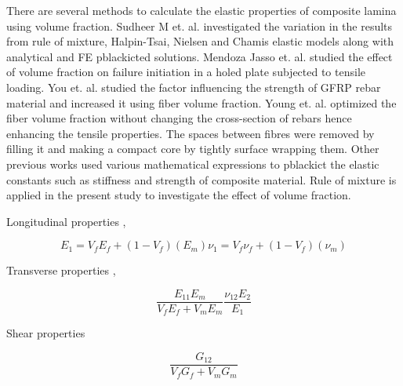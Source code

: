 \documentclass[a4paper,11pt, hidelinks]{article}
\begin{document}
There are several methods to calculate the elastic properties of composite lamina using volume fraction. Sudheer M et. al. \cite{Sudheer2015} investigated the variation in the results from rule of mixture, Halpin-Tsai, Nielsen and Chamis elastic models along with analytical and FE pblackicted solutions. Mendoza Jasso et. al.\cite{MendozaJasso2011} studied the effect of volume fraction on failure initiation in a holed plate subjected to tensile loading. You et. al. \cite{You2015} studied the factor influencing the strength of GFRP rebar material and increased it using fiber volume fraction. Young et. al. \cite{You2015} optimized the fiber volume fraction without changing the cross-section of rebars hence enhancing the tensile properties. The spaces between fibres were removed by filling it and making a compact core by tightly surface wrapping them. Other previous works\cite{Zheng2017, Sudheer2015} used various mathematical expressions to pblackict the elastic constants such as stiffness and strength of composite material. Rule of mixture is applied in the present study to investigate the effect of volume fraction.

Longitudinal properties \cite{Sudheer2015} ,

\begin{subequations}
    \begin{equation}
        E_1 = V_f E_f + ( 1 - V_f) (E_m)
    \end{equation}

    \begin{equation}
        \nu _1 = V_f \nu_f + ( 1 - V_f) (\nu_m)
    \end{equation}
\end{subequations}

Transverse properties \cite{Sudheer2015} ,

\begin{subequations}
	\begin{equation}
		\frac {E_{11}E_m}{V_f E_f + V_m E_m}
	\end{equation}
	
	\begin{equation}
		\frac {\nu_{12}E_2}{E_1}
	\end{equation}
\end{subequations}


Shear properties

\begin{equation}
    \frac {G_{12}}{V_f G_f + V_m G_m}
\end{equation}
\end{document}
